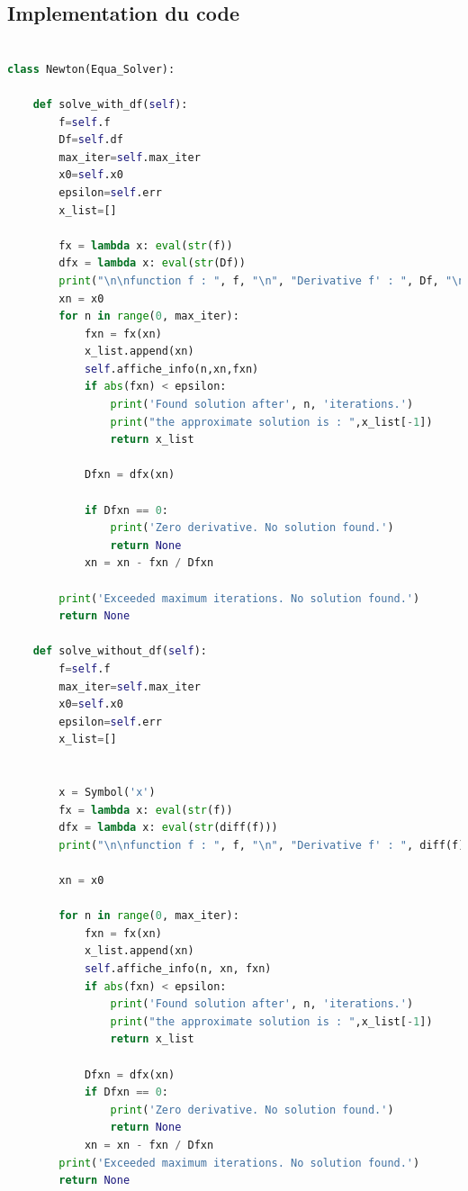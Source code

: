 \documentclass{article}
\begin{document}
\subsection{Implementation du code}
\begin{lstlisting}[language=Python, caption=Méthode de Newton en Python]

class Newton(Equa_Solver):

    def solve_with_df(self):
        f=self.f
        Df=self.df
        max_iter=self.max_iter
        x0=self.x0
        epsilon=self.err
        x_list=[]

        fx = lambda x: eval(str(f))
        dfx = lambda x: eval(str(Df))
        print("\n\nfunction f : ", f, "\n", "Derivative f' : ", Df, "\n", "--------------------------------")
        xn = x0
        for n in range(0, max_iter):
            fxn = fx(xn)
            x_list.append(xn)
            self.affiche_info(n,xn,fxn)
            if abs(fxn) < epsilon:
                print('Found solution after', n, 'iterations.')
                print("the approximate solution is : ",x_list[-1])
                return x_list

            Dfxn = dfx(xn)

            if Dfxn == 0:
                print('Zero derivative. No solution found.')
                return None
            xn = xn - fxn / Dfxn

        print('Exceeded maximum iterations. No solution found.')
        return None
        
    def solve_without_df(self):
        f=self.f
        max_iter=self.max_iter
        x0=self.x0
        epsilon=self.err
        x_list=[]


        x = Symbol('x')
        fx = lambda x: eval(str(f))
        dfx = lambda x: eval(str(diff(f)))
        print("\n\nfunction f : ", f, "\n", "Derivative f' : ", diff(f), "\n", "--------------------------------")

        xn = x0

        for n in range(0, max_iter):
            fxn = fx(xn)
            x_list.append(xn)
            self.affiche_info(n, xn, fxn)
            if abs(fxn) < epsilon:
                print('Found solution after', n, 'iterations.')
                print("the approximate solution is : ",x_list[-1])
                return x_list
                
            Dfxn = dfx(xn)
            if Dfxn == 0:
                print('Zero derivative. No solution found.')
                return None
            xn = xn - fxn / Dfxn
        print('Exceeded maximum iterations. No solution found.')
        return None
\end{lstlisting}
\end{document}
